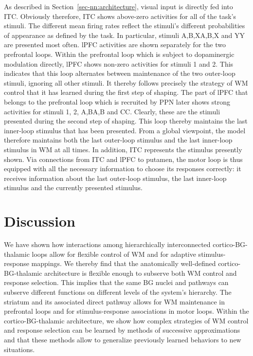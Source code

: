 \documentclass[
  11pt,
  a4paper,
]{scrbook}
\begin{document}
As described in Section~\ref{sec-nn:architecture}, visual input is
directly fed into ITC. Obviously therefore, ITC shows above-zero
activities for all of the task's stimuli. The different mean firing
rates reflect the stimuli's different probabilities of appearance as
defined by the task. In particular, stimuli A,B,XA,B,X and YY are
presented most often. lPFC activities are shown separately for the two
prefrontal loops. Within the prefrontal loop which is subject to
dopaminergic modulation directly, lPFC shows non-zero activities for
stimuli 1 and 2. This indicates that this loop alternates between
maintenance of the two outer-loop stimuli, ignoring all other stimuli.
It thereby follows precisely the strategy of WM control that it has
learned during the first step of shaping. The part of lPFC that belongs
to the prefrontal loop which is recruited by PPN later shows strong
activities for stimuli 1, 2, A,BA,B and CC. Clearly, these are the
stimuli presented during the second step of shaping. This loop thereby
maintains the last inner-loop stimulus that has been presented. From a
global viewpoint, the model therefore maintains both the last outer-loop
stimulus and the last inner-loop stimulus in WM at all times. In
addition, ITC represents the stimulus presently shown. Via connections
from ITC and lPFC to putamen, the motor loop is thus equipped with all
the necessary information to choose its responses correctly: it receives
information about the last outer-loop stimulus, the last inner-loop
stimulus and the currently presented stimulus.

\section{Discussion}\label{sec-nn:discussion}

We have shown how interactions among hierarchically interconnected
cortico-BG-thalamic loops allow for flexible control of WM and for
adaptive stimulus-response mappings. We thereby find that the
anatomically well-defined cortico-BG-thalamic architecture is flexible
enough to subserve both WM control and response selection. This implies
that the same BG nuclei and pathways can subserve different functions on
different levels of the system's hierarchy. The striatum and its
associated direct pathway allows for WM maintenance in prefrontal loops
and for stimulus-response associations in motor loops. Within the
cortico-BG-thalamic architecture, we show how complex strategies of WM
control and response selection can be learned by methods of successive
approximations and that these methods allow to generalize previously
learned behaviors to new situations.
\end{document}
